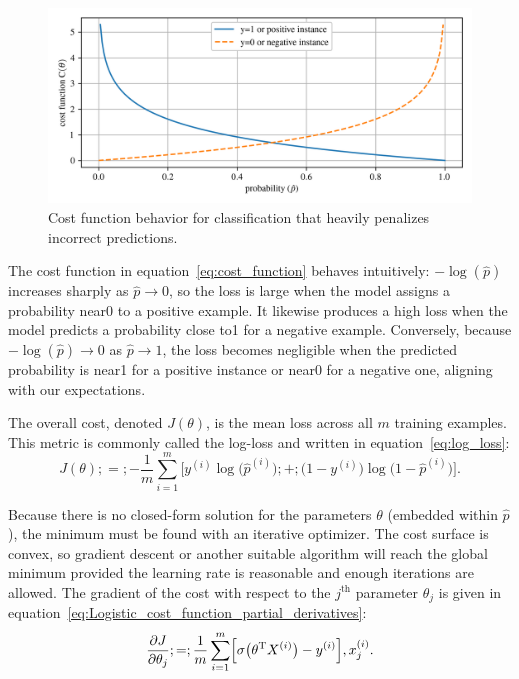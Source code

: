 \documentclass[12pt,letter]{article}
\begin{document}
\begin{figure}[H]
	\centering
	\includegraphics[width=5.5in]{../figures/Logistic_Regression_cost_function.png}
	\caption{Cost function behavior for classification that heavily penalizes incorrect predictions.}
	\label{fig:Logistic_Regression_cost_function}
\end{figure}

The cost function in equation~\ref{eq:cost_function} behaves intuitively: $-\log(\hat{p})$ increases sharply as $\hat{p} \to 0$, so the loss is large when the model assigns a probability near0 to a positive example. It likewise produces a high loss when the model predicts a probability close to1 for a negative example. Conversely, because $-\log(\hat{p})\to0$ as $\hat{p} \to 1$, the loss becomes negligible when the predicted probability is near1 for a positive instance or near0 for a negative one, aligning with our expectations.



The overall cost, denoted $J(\theta)$, is the mean loss across all $m$ training examples. This metric is commonly called the log-loss and written in equation~\ref{eq:log_loss}:
\begin{equation}
J(\theta) ;=; -\frac{1}{m}\sum_{i=1}^{m}\Big[y^{(i)} \log \bigl(\hat{p}^{(i)}\bigr) ;+; \bigl(1 - y^{(i)}\bigr) \log \bigl(1-\hat{p}^{(i)}\bigr)\Big].
\label{eq:log_loss}
\end{equation}

Because there is no closed-form solution for the parameters $\theta$ (embedded within $\hat{p}$), the minimum must be found with an iterative optimizer. The cost surface is convex, so gradient descent or another suitable algorithm will reach the global minimum provided the learning rate is reasonable and enough iterations are allowed. The gradient of the cost with respect to the $j^\text{th}$ parameter $\theta_j$ is given in equation~\ref{eq:Logistic_cost_function_partial_derivatives}:
\begin{equation}
\frac{\partial J}{\partial \theta_j} ;=; \frac{1}{m} \sum_{i=1}^{m} \Bigl[\sigma \bigl(\theta^\text{T}X^{(i)}\bigr) - y^{(i)}\Bigr],x^{(i)}_{j}.
\label{eq:Logistic_cost_function_partial_derivatives}
\end{equation}
\end{document}
